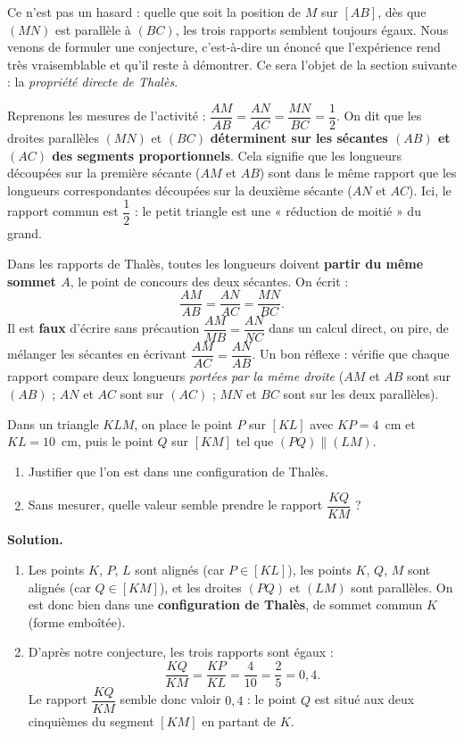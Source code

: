 \documentclass[11pt]{article}
\newcommand{\cle}[1]{{\popxbold\color{popdark}#1}}
\begin{document}
Ce n'est pas un hasard : quelle que soit la position de $M$ sur $[AB]$, dès que $(MN)$ est parallèle à $(BC)$, les trois rapports semblent toujours égaux. Nous venons de formuler une \cle{conjecture}, c'est-à-dire un énoncé que l'expérience rend très vraisemblable et qu'il reste à démontrer. Ce sera l'objet de la section suivante : la \emph{propriété directe de Thalès}.

\begin{exemplebox}
Reprenons les mesures de l'activité : $\dfrac{AM}{AB} = \dfrac{AN}{AC} = \dfrac{MN}{BC} = \dfrac{1}{2}$.
On dit que les droites parallèles $(MN)$ et $(BC)$ \textbf{déterminent sur les sécantes $(AB)$ et $(AC)$ des segments proportionnels}. Cela signifie que les longueurs découpées sur la première sécante ($AM$ et $AB$) sont dans le même rapport que les longueurs correspondantes découpées sur la deuxième sécante ($AN$ et $AC$). Ici, le rapport commun est $\dfrac{1}{2}$ : le petit triangle est une « réduction de moitié » du grand.
\end{exemplebox}

\begin{attention}
Dans les rapports de Thalès, toutes les longueurs doivent \textbf{partir du même sommet $A$}, le point de concours des deux sécantes. On écrit :
\[ \frac{AM}{AB} = \frac{AN}{AC} = \frac{MN}{BC}. \]
Il est \textbf{faux} d'écrire sans précaution $\dfrac{AM}{MB} = \dfrac{AN}{NC}$ dans un calcul direct, ou pire, de mélanger les sécantes en écrivant $\dfrac{AM}{AC} = \dfrac{AN}{AB}$. Un bon réflexe : vérifie que chaque rapport compare deux longueurs \emph{portées par la même droite} ($AM$ et $AB$ sont sur $(AB)$ ; $AN$ et $AC$ sont sur $(AC)$ ; $MN$ et $BC$ sont sur les deux parallèles).
\end{attention}

\begin{exoresolu}
Dans un triangle $KLM$, on place le point $P$ sur $[KL]$ avec $KP = 4$~cm et $KL = 10$~cm, puis le point $Q$ sur $[KM]$ tel que $(PQ) \parallel (LM)$.
\begin{enumerate}
\item Justifier que l'on est dans une configuration de Thalès.
\item Sans mesurer, quelle valeur semble prendre le rapport $\dfrac{KQ}{KM}$ ?
\end{enumerate}
\tcblower
\textbf{Solution.}
\begin{enumerate}
\item Les points $K$, $P$, $L$ sont alignés (car $P \in [KL]$), les points $K$, $Q$, $M$ sont alignés (car $Q \in [KM]$), et les droites $(PQ)$ et $(LM)$ sont parallèles. On est donc bien dans une \textbf{configuration de Thalès}, de sommet commun $K$ (forme emboîtée).
\item D'après notre conjecture, les trois rapports sont égaux :
\[ \frac{KQ}{KM} = \frac{KP}{KL} = \frac{4}{10} = \frac{2}{5} = 0,4. \]
Le rapport $\dfrac{KQ}{KM}$ semble donc valoir $0,4$ : le point $Q$ est situé aux deux cinquièmes du segment $[KM]$ en partant de $K$.
\end{enumerate}
\end{exoresolu}
\end{document}
